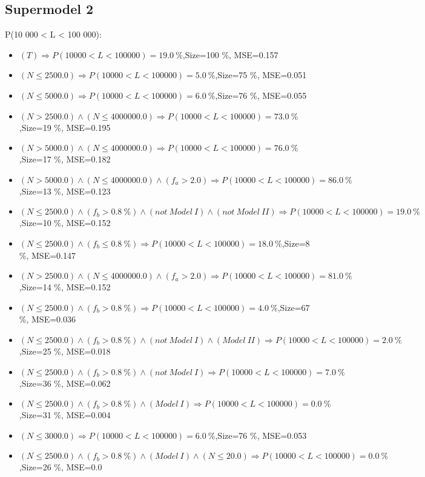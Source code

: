 \documentclass[numbered]{CSL}
\begin{document}
\subsection{Supermodel 2}
P(10 000 < L < 100 000):
\begin{itemize}
\item $(T) \Rightarrow P(10 000 < L < 100 000) = 19.0~\%$,\hfill Size=100 \%, MSE=0.157
\item $(N \leq 2500.0) \Rightarrow P(10 000 < L < 100 000) = 5.0~\%$,\hfill Size=75 \%, MSE=0.051
\item $(N \leq 5000.0) \Rightarrow P(10 000 < L < 100 000) = 6.0~\%$,\hfill Size=76 \%, MSE=0.055
\item $(N > 2500.0) \land (N \leq 4000000.0) \Rightarrow P(10 000 < L < 100 000) = 73.0~\%$,\hfill Size=19 \%, MSE=0.195
\item $(N > 5000.0) \land (N \leq 4000000.0) \Rightarrow P(10 000 < L < 100 000) = 76.0~\%$,\hfill Size=17 \%, MSE=0.182
\item $(N > 5000.0) \land (N \leq 4000000.0) \land (f_a > 2.0) \Rightarrow P(10 000 < L < 100 000) = 86.0~\%$,\hfill Size=13 \%, MSE=0.123
\item $(N \leq 2500.0) \land (f_b > 0.8~\%) \land (not~Model~I) \land (not~Model~II) \Rightarrow P(10 000 < L < 100 000) = 19.0~\%$,\hfill Size=10 \%, MSE=0.152
\item $(N \leq 2500.0) \land (f_b \leq 0.8~\%) \Rightarrow P(10 000 < L < 100 000) = 18.0~\%$,\hfill Size=8 \%, MSE=0.147
\item $(N > 2500.0) \land (N \leq 4000000.0) \land (f_a > 2.0) \Rightarrow P(10 000 < L < 100 000) = 81.0~\%$,\hfill Size=14 \%, MSE=0.152
\item $(N \leq 2500.0) \land (f_b > 0.8~\%) \Rightarrow P(10 000 < L < 100 000) = 4.0~\%$,\hfill Size=67 \%, MSE=0.036
\item $(N \leq 2500.0) \land (f_b > 0.8~\%) \land (not~Model~I) \land (Model~II) \Rightarrow P(10 000 < L < 100 000) = 2.0~\%$,\hfill Size=25 \%, MSE=0.018
\item $(N \leq 2500.0) \land (f_b > 0.8~\%) \land (not~Model~I) \Rightarrow P(10 000 < L < 100 000) = 7.0~\%$,\hfill Size=36 \%, MSE=0.062
\item $(N \leq 2500.0) \land (f_b > 0.8~\%) \land (Model~I) \Rightarrow P(10 000 < L < 100 000) = 0.0~\%$,\hfill Size=31 \%, MSE=0.004
\item $(N \leq 3000.0) \Rightarrow P(10 000 < L < 100 000) = 6.0~\%$,\hfill Size=76 \%, MSE=0.053
\item $(N \leq 2500.0) \land (f_b > 0.8~\%) \land (Model~I) \land (N \leq 20.0) \Rightarrow P(10 000 < L < 100 000) = 0.0~\%$,\hfill Size=26 \%, MSE=0.0

\end{itemize}
\end{document}
